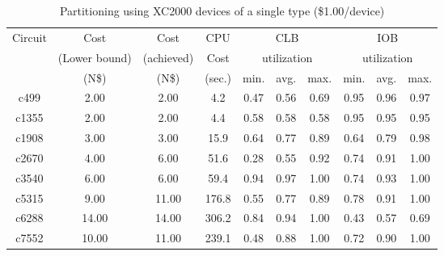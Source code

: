 \begin{table}[hpbt]
\begin{center}
\begin{tabular}{|c|c|c|c|c|c|c|c|c|c|}\hline
 Circuit   &Cost         &Cost             &CPU      &\multicolumn{3}{c|}{CLB}          &\multicolumn{3}{c|}{IOB} \\  
 \hfill    &(Lower bound)&(achieved)       &Cost     &\multicolumn{3}{c|}{utilization}  &\multicolumn{3}{c|}{utilization}\\ \cline{5-10}
\hfill     &(N\$)         &(N\$)             &(sec.)   &min.    &avg.    &max.            &min.     &avg.    &max. \\ \hline \hline
 c499      &2.00            &2.00            &4.2      &0.47    &0.56    &0.69            &0.95     &0.96    &0.97 \\ \hline 
 c1355     &2.00            &2.00            &4.4      &0.58    &0.58    &0.58            &0.95     &0.95    &0.95 \\ \hline    
 c1908     &3.00            &3.00            &15.9     &0.64    &0.77    &0.89            &0.64     &0.79    &0.98 \\ \hline 
 c2670     &4.00            &6.00            &51.6     &0.28    &0.55    &0.92            &0.74     &0.91    &1.00 \\ \hline 
 c3540     &6.00            &6.00            &59.4     &0.94    &0.97    &1.00            &0.74     &0.93    &1.00 \\ \hline
 c5315     &9.00            &11.00           &176.8    &0.55    &0.77    &0.89            &0.78     &0.91    &1.00 \\ \hline
 c6288     &14.00           &14.00           &306.2    &0.84    &0.94    &1.00            &0.43     &0.57    &0.69 \\ \hline 
 c7552     &10.00           &11.00           &239.1    &0.48    &0.88    &1.00            &0.72     &0.90    &1.00 \\ \hline
\end{tabular}
\caption{Partitioning using XC2000 devices of a single type (\$1.00/device)}
\label{tb:tb3}
\end{center}
\end{table}

